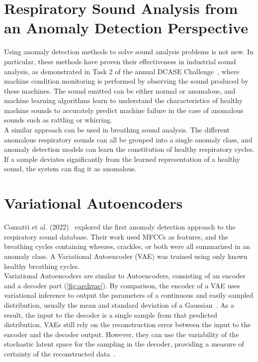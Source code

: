\section{Respiratory Sound Analysis from an Anomaly Detection Perspective}
Using anomaly detection methods to solve sound analysis problems is not new. In particular, these methods have proven their effectiveness in industrial sound analysis, as demonstrated in Task 2 of the annual DCASE Challenge~\cite{dcaseDCASE2023Challenge}, where machine condition monitoring is performed by observing the sound produced by these machines. The sound emitted can be either normal or anomalous, and machine learning algorithms learn to understand the characteristics of healthy machine sounds to accurately predict machine failure in the case of anomalous sounds such as rattling or whirring.\\
A similar approach can be used in breathing sound analysis. The different anomalous respiratory sounds can all be grouped into a single anomaly class, and anomaly detection models can learn the constitution of healthy respiratory cycles. If a sample deviates significantly from the learned representation of a healthy sound, the system can flag it as anomalous.


\section{Variational Autoencoders}
Cozzatti et al. (2022)~\cite{cozzatti2022variational} explored the first anomaly detection approach to the respiratory sound database. Their work used MFCCs as features, and the breathing cycles containing wheezes, crackles, or both were all summarized in an anomaly class. A Variational Autoencoder (VAE) was trained using only known healthy breathing cycles.\\
Variational Autoencoders are similar to Autoencoders, consisting of an encoder and a decoder part (\autoref{fig:archvae}). By comparison, the encoder of a VAE uses variational inference to output the parameters of a continuous and easily sampled distribution, usually the mean and standard deviation of a  Gaussian~\cite{cozzatti2022variational}. As a result, the input to the decoder is a single sample from that predicted distribution. VAEs still rely on the reconstruction error between the input to the encoder and the decoder output. However, they can use the variability of the stochastic latent space for the sampling in the decoder, providing a measure of certainty of the reconstructed data~\cite{an2015variational}.\\

